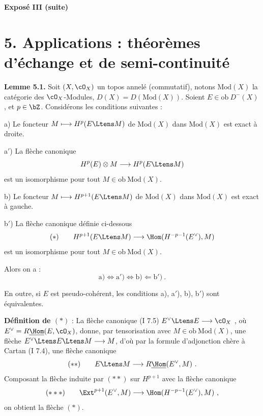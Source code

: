 
\noindent\textbf{\Large Expos\'{e} III (suite)}

\medskip

\section*{5. Applications : th\'{e}or\`{e}mes d'\'{e}change et de semi-continuit\'{e}}

\noindent\textbf{Lemme 5.1.} Soit $(X,\cO_X)$ un topos annel\'{e} (commutatif), notons $\mathrm{Mod}(X)$ la cat\'{e}gorie des $\cO_X$-Modules, $D(X) = D(\mathrm{Mod}(X))$. Soient $E \in \mathrm{ob}\ D^-(X)$, et $p \in \bZ$. Consid\'{e}rons les conditions suivantes :

\medskip

\noindent a) Le foncteur $M \longmapsto H^p(E \Ltens M)$ de $\mathrm{Mod}(X)$ dans $\mathrm{Mod}(X)$ est exact \`{a} droite.

\smallskip

\noindent a$'$) La fl\`{e}che canonique
\[
H^p(E) \otimes M \longrightarrow H^p(E \Ltens M)
\]
est un isomorphisme pour tout $M \in \mathrm{ob}\ \mathrm{Mod}(X)$.

\smallskip

\noindent b) Le foncteur $M \longmapsto H^{p+1}(E \Ltens M)$ de $\mathrm{Mod}(X)$ dans $\mathrm{Mod}(X)$ est exact \`{a} gauche.

\smallskip

\noindent b$'$) La fl\`{e}che canonique d\'{e}finie ci-dessous
\[
(*) \qquad H^{p+1}(E \Ltens M) \longrightarrow \Hom(H^{-p-1}(E^\vee), M)
\]
est un isomorphisme pour tout $M \in \mathrm{ob}\ \mathrm{Mod}(X)$.

\medskip

Alors on a :
\[
\mathrm{a)} \Longleftrightarrow \mathrm{a')} \Longleftrightarrow \mathrm{b)} \Longleftarrow \mathrm{b')}\ .
\]

En outre, si $E$ est pseudo-coh\'{e}rent, les conditions a), a$'$), b), b$'$) sont \'{e}quivalentes.

\medskip

\noindent\textbf{D\'{e}finition de $(*)$} : La fl\`{e}che canonique (I 7.5) $E^\vee \Ltens E \longrightarrow \cO_X$ , o\`{u} $E^\vee = R\underline{\Hom}(E, \cO_X)$, donne, par tensorisation avec $M \in \mathrm{ob}\ \mathrm{Mod}(X)$, une fl\`{e}che $E^\vee \Ltens E \Ltens M \longrightarrow M$, d'o\`{u} par la formule d'adjonction ch\`{e}re \`{a} Cartan (I 7.4), une fl\`{e}che canonique
\[
(**) \qquad E \Ltens M \longrightarrow R\underline{\Hom}(E^\vee, M)\ .
\]
Composant la fl\`{e}che induite par $(**)$ sur $H^{p+1}$ avec la fl\`{e}che canonique
\[
(***) \qquad \Ext^{p+1}(E^\vee, M) \longrightarrow \Hom(H^{-p-1}(E^\vee), M)\ ,
\]
on obtient la fl\`{e}che $(*)$.

